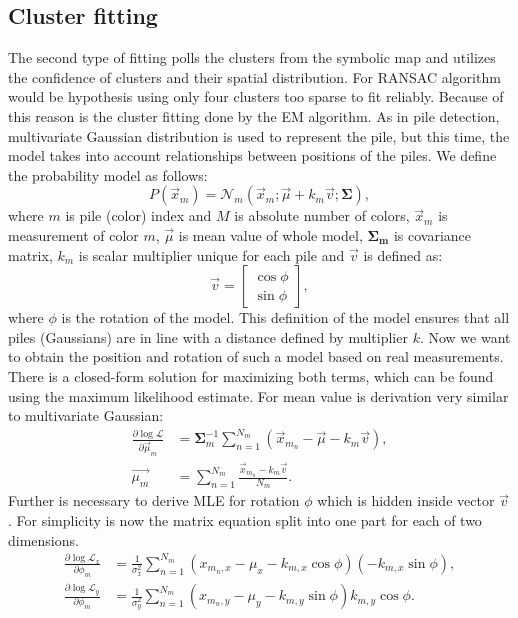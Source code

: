 \subsection{Cluster fitting}
The second type of fitting polls the clusters from the symbolic map and utilizes the confidence of clusters and their spatial distribution. For RANSAC algorithm would be hypothesis using only four clusters too sparse to fit reliably. Because of this reason is the cluster fitting done by the EM algorithm. As in pile detection, multivariate Gaussian distribution is used to represent the pile, but this time, the model takes into account relationships between positions of the piles. We define the probability model as follows:
\begin{equation}
P(\vec{x}_m) = \mathcal{N}_m(\vec{x}_m; \vec{\mu} + k_m\vec{v}; \bm{\Sigma}),
\label{eq:prob}
\end{equation}
where $m$ is pile (color) index and $M$ is absolute number of colors, $\vec{x}_m$ is measurement of color $m$, $\vec{\mu}$ is mean value of whole model, $\bm{\Sigma_m}$ is covariance matrix, $k_m$ is scalar multiplier unique for each pile and $\vec{v}$ is defined as:
\begin{equation}
\vec{v} = \begin{bmatrix}
\cos \phi \\
\sin \phi
\end{bmatrix},
\end{equation}
where $\phi$ is the rotation of the model. This definition of the model ensures that all piles (Gaussians) are in line with a distance defined by multiplier $k$. Now we want to obtain the position and rotation of such a model based on real measurements. There is a closed-form solution for maximizing both terms, which can be found using the maximum likelihood estimate. For mean value is derivation very similar to multivariate Gaussian:
\begin{align}
\frac{\partial \log\mathcal{L} }{\partial \vec{\mu}_m} &=  \bm{\Sigma}^{-1}_m \sum_{n = 1}^{N_m} (\vec{x}_{m_n} - \vec{\mu} - k_m \vec{v}), \\
\vec{\mu_m} &= \sum_{n = 1}^{N_m} \frac{\vec{x}_{m_n} - k_m \vec{v}}{N_m}.
\end{align}
Further is necessary to derive MLE for rotation $\phi$ which is hidden inside vector $\vec{v}$. For simplicity is now the matrix equation split into one part for each of two dimensions.  
\begin{align}
\frac{\partial \log\mathcal{L}_x }{\partial \phi_m} &= \frac{1}{\sigma^2_x} \sum_{n=1}^{N_m} (x_{m_n, x} - \mu_x - k_{m, x} \cos \phi) \left( -k_{m,x} \sin \phi\right),  \\
\frac{\partial \log\mathcal{L}_y }{\partial \phi_m} &= \frac{1}{\sigma^2_y} \sum_{n=1}^{N_m} (x_{m_n, y} - \mu_y - k_{m, y} \sin \phi) k_{m,y} \cos \phi.
\end{align}
